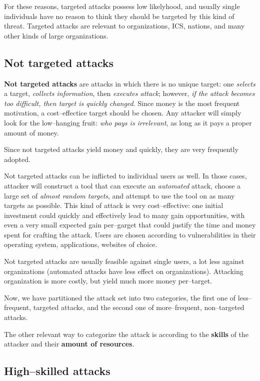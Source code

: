 \documentclass[10pt]{extbook}
\begin{document}
For these reasons, targeted attacks possess low likelyhood, and usually single
individuals have no reason to think they should be targeted by this kind of
threat. Targeted attacks are relevant to organizations, ICS, nations, and many
other kinds of large organizations.

\subsection{Not targeted attacks}

\textbf{Not targeted attacks} are attacks in which there is no unique target:
one \emph{selects} a target, \emph{collects information}, then \emph{executes
attack}; however, \emph{if the attack becomes too difficult, then target is
quickly changed}. Since money is the most frequent motivation, a
cost--effectice target should be chosen. Any attacker will simply look for the
low--hanging fruit: \emph{who pays is irrelevant}, as long as it pays a proper
amount of money.

Since not targeted attacks yield money and quickly, they are very frequently
adopted.

Not targeted attacks can be inflicted to individual users as well.
In those cases, attacker will construct a tool that can execute an
\emph{automated} attack, choose a large set of \emph{almost random targets},
and attempt to use the tool on as many targets as possible. This kind of attack
is very cost--effective: one initial investment could quickly and effectively
lead to many gain opportunities, with even a very small expected gain
per--garget that could justify the time and money spent for crafting the
attack. Users are chosen according to vulnerabilities in their operating
system, applications, websites of choice.

Not targeted attacks are usually feasible against single users, a lot
less against organizations (automated attacks have less effect on
organizations). Attacking organization is more costly, but yield much more
money per--target.

\bigskip

Now, we have partitioned the attack set into two categories, the first one of
less--frequent, targeted attacks, and the second one of more--frequent,
non--targeted attacks.

The other relevant way to categorize the attack is according to the
\textbf{skills} of the attacker and their \textbf{amount of resources}.

\subsection{High--skilled attacks}
\end{document}
